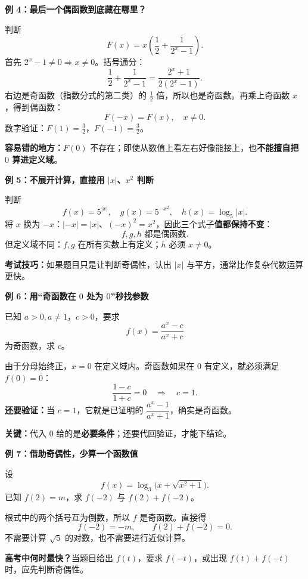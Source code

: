 \clearpage
\begin{examplebox}
\textbf{\textcolor{CExample}{例 4：最后一个偶函数到底藏在哪里？}}

判断
\[
 F(x)=x\left(\frac12+\frac1{2^x-1}\right).
\]
首先 $2^x-1\ne0\Rightarrow x\ne0$。括号通分：
\[
 \frac12+\frac1{2^x-1}
 =\frac{2^x+1}{2(2^x-1)}.
\]
右边是奇函数（指数分式的第二类）的 $\tfrac12$ 倍，所以也是奇函数。再乘上奇函数 $x$，得到偶函数：
\[
 \boxed{F(-x)=F(x),\quad x\ne0}.
\]
数字验证：$F(1)=\tfrac32$，$F(-1)=\tfrac32$。

\textbf{容易错的地方：}$F(0)$ 不存在；即使从数值上看左右好像能接上，也\textbf{不能擅自把 $0$ 算进定义域}。
\end{examplebox}
\clearpage
\begin{examplebox}
\textbf{\textcolor{CExample}{例 5：不展开计算，直接用 $|x|$、$x^2$ 判断}}

判断
\[
 f(x)=5^{|x|},\quad
 g(x)=5^{-x^2},\quad
 h(x)=\log_5|x|.
\]
将 $x$ 换为 $-x$：$|-x|=|x|$、$(-x)^2=x^2$，因此三个式子\textbf{值都保持不变}：
\[
 \boxed{f,g,h\text{ 都是偶函数}}.
\]
但定义域不同：$f,g$ 在所有实数上有定义；$h$ 必须 $x\ne0$。

\textbf{考试技巧：}如果题目只是让判断奇偶性，认出 $|x|$ 与平方，通常比作复杂代数运算更快。
\end{examplebox}
\clearpage
\begin{examplebox}
\textbf{\textcolor{CExample}{例 6：用“奇函数在 $0$ 处为 $0$”秒找参数}}

已知 $a>0,a\ne1$，$c>0$，要求
\[
 f(x)=\frac{a^x-c}{a^x+c}
\]
为奇函数，求 $c$。

由于分母始终正，$x=0$ 在定义域内。奇函数如果在 $0$ 有定义，就必须满足 $f(0)=0$：
\[
 \frac{1-c}{1+c}=0\quad\Longrightarrow\quad\boxed{c=1}.
\]
\textbf{还要验证：}当 $c=1$，它就是已证明的 $\dfrac{a^x-1}{a^x+1}$，确实是奇函数。

\textbf{关键：}代入 $0$ 给的是\textbf{必要条件}；还要代回验证，才能下结论。
\end{examplebox}
\clearpage
\begin{examplebox}
\textbf{\textcolor{CExample}{例 7：借助奇偶性，少算一个函数值}}

设
\[
 f(x)=\log_3\!\bigl(x+\sqrt{x^2+1}\bigr).
\]
已知 $f(2)=m$，求 $f(-2)$ 与 $f(2)+f(-2)$。

根式中的两个括号互为倒数，所以 $f$ 是奇函数。直接得
\[
 \boxed{f(-2)=-m},\qquad
 \boxed{f(2)+f(-2)=0}.
\]
不需要计算 $\sqrt5$ 的对数，也不需要进行近似计算。

\textbf{高考中何时最快？}当题目给出 $f(t)$，要求 $f(-t)$，或出现 $f(t)+f(-t)$ 时，应先判断奇偶性。
\end{examplebox}
